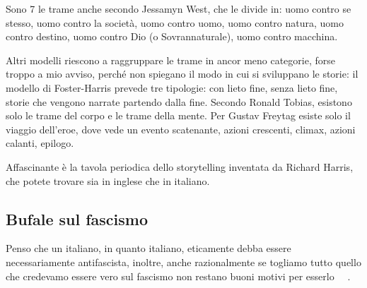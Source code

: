 \documentclass[12pt]{book} %
\begin{document}
Sono 7 le trame anche secondo Jessamyn West, che le divide in: uomo contro se stesso, uomo contro la società, uomo
contro uomo, uomo contro natura, uomo contro destino, uomo contro Dio (o Sovrannaturale), uomo contro macchina.

Altri modelli riescono a raggruppare le trame in ancor meno categorie, forse troppo a mio avviso, perché non spiegano il
modo in cui si sviluppano le storie: il modello di Foster-Harris prevede tre tipologie: con lieto fine, senza lieto
fine, storie che vengono narrate partendo dalla fine. Secondo Ronald Tobias, esistono solo le trame del corpo e le
trame della mente. Per Gustav Freytag esiste solo il viaggio dell'eroe, dove vede un evento
scatenante, azioni crescenti, climax, azioni calanti,
epilogo.

Affascinante è la tavola periodica dello storytelling inventata da Richard Harris, che potete trovare sia in
inglese che in
italiano.

\subsection{Bufale sul fascismo}
Penso che un italiano, in quanto italiano, eticamente debba essere necessariamente antifascista, inoltre, anche
razionalmente se togliamo tutto quello che credevamo essere vero sul fascismo non restano buoni motivi per
esserlo \ \ .
\end{document}

